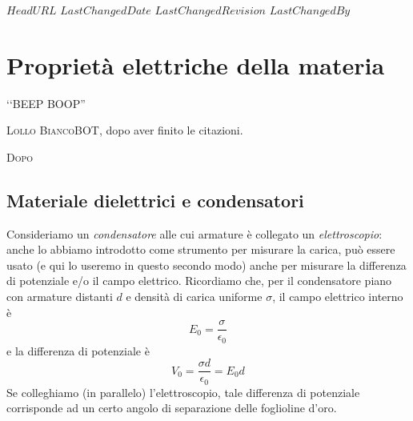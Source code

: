 \svnidlong
{$HeadURL$}
{$LastChangedDate$}
{$LastChangedRevision$}
{$LastChangedBy$}

\chapter{Proprietà elettriche della materia}

\begin{introduction}
	‘‘BEEP BOOP''
	\begin{flushright}
		\textsc{Lollo BiancoBOT}, dopo aver finito le citazioni. %
	\end{flushright}
\end{introduction}
\lettrine[findent=1pt, nindent=0pt]{D}{opo}
\section{Materiale dielettrici e condensatori}
Consideriamo un \textit{condensatore} alle cui armature è collegato un \textit{elettroscopio}: anche lo abbiamo introdotto come strumento per misurare la carica, può essere usato (e qui lo useremo in questo secondo modo) anche per misurare la differenza di potenziale e/o il campo elettrico. Ricordiamo che, per il condensatore piano con armature distanti $d$ e densità di carica uniforme $\sigma$, il campo elettrico interno è
\begin{equation*}
	E_0=\frac{\sigma}{\epsilon_0}
\end{equation*}
e la differenza di potenziale è
\begin{equation*}
	V_0=\frac{\sigma d}{\epsilon_0}=E_0d
\end{equation*}
Se colleghiamo (in parallelo) l'elettroscopio, tale differenza di potenziale corrisponde ad un certo angolo di separazione delle foglioline d'oro. 

